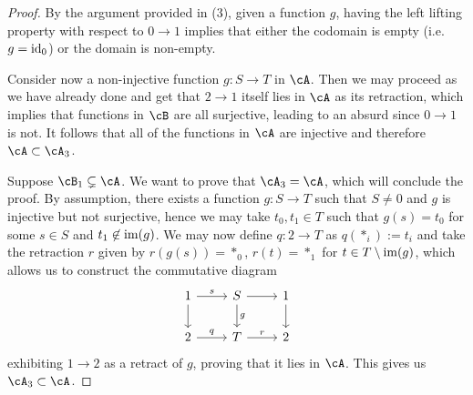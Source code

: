 \documentclass[a4paper,11pt,openany]{scrartcl}
\begin{document}
\begin{proof}
    By the argument provided in (3), given a function $g$, having the left
    lifting property with respect to $0\rightarrow 1$ implies that either the
    codomain is empty (i.e.\ $g=\operatorname{id}_0$) or the domain is non-empty.

    Consider now a non-injective function $g\colon S\rightarrow T$ in $\cA$.
    Then we may proceed as we have already done and get that $2\rightarrow 1$
    itself lies in $\cA$ as its
    retraction, which implies that functions in $\cB$ are all surjective,
    leading to an absurd since $0\rightarrow 1$ is not. It follows that all of
    the functions in $\cA$ are injective and therefore $\cA\subset\cA_3$.

    Suppose $\cB_1\subsetneq\cA$. We want to prove that $\cA_3=\cA$, which will
    conclude the proof. By assumption, there exists a function $g\colon
    S\rightarrow T$ such that $S\neq 0$ and $g$ is injective but not surjective,
    hence we may take $t_0,t_1\in T$ such that $g(s)=t_0$ for some $s\in S$ and
    $t_1\not\in\operatorname{im}(g)$. We may now define $q\colon 2\rightarrow T$ as
    $q(*_i):=t_i$ and take the retraction $r$ given by $r(g(s))=*_0$, $r(t)=*_1$
    for $t\in T\setminus\operatorname{im}(g)$, which allows us to construct the
    commutative diagram
    \[\begin{tikzcd}
	{1} & {S} & {1} \\
	{2} & {T} & {2}
	\arrow["{s}", from=1-1, to=1-2]
	\arrow[from=1-2, to=1-3]
	\arrow["{q}", from=2-1, to=2-2]
	\arrow["{r}", from=2-2, to=2-3]
	\arrow[from=1-1, to=2-1]
	\arrow["{g}", from=1-2, to=2-2]
	\arrow[from=1-3, to=2-3]
    \end{tikzcd}\]
    exhibiting $1\rightarrow 2$ as a retract of $g$, proving that it lies in
    $\cA$. This gives us $\cA_3\subset\cA$.
\end{proof}
\end{document}
